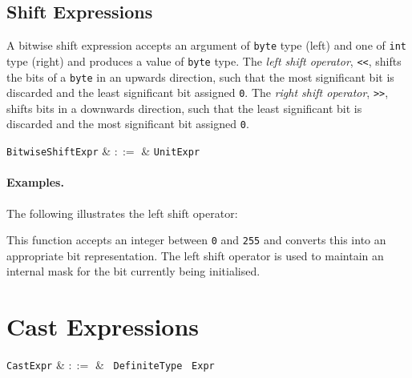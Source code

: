
\subsection{Shift Expressions}
\label{c_expr_shift}

A bitwise shift expression accepts an argument of \lstinline{byte} type (left) and one of \lstinline{int} type (right) and produces a value of \lstinline{byte} type.  The {\em left shift operator}, \lstinline{<<}, shifts the bits of a \lstinline{byte} in an upwards direction, such that the most significant bit is discarded and the least significant bit assigned \lstinline{0}.  The {\em right shift operator}, \lstinline{>>}, shifts bits in a downwards direction, such that the least significant bit is discarded and the most significant bit assigned \lstinline{0}.  

\begin{syntax}
  \verb+BitwiseShiftExpr+ & $::=$ & \verb+UnitExpr+\ 
\end{syntax}

\paragraph{Examples.} The following illustrates the left shift operator:



This function accepts an integer between \lstinline{0} and \lstinline{255} and converts this into an appropriate bit representation.  The left shift operator is used to maintain an internal mask for the bit currently being initialised.


\section{Cast Expressions}
\label{c_expr_cast}

\begin{syntax}
\verb+CastExpr+ & $::=$ & \token{(}\ \verb+DefiniteType+ \token{)}\ \verb+Expr+\\
\end{syntax}

